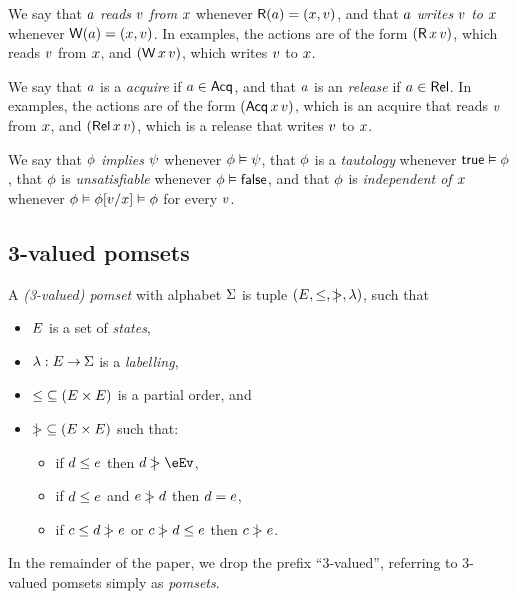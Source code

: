 We say that $a$ \emph{reads} $v$ \emph{from} $x$ whenever
$\mathsf{R}(a) = (x,v)$, and that $a$ \emph{writes} $v$
\emph{to} $x$ whenever $\mathsf{W}(a) = (x,v)$.  In examples,
the actions are of the form $(\DR{\aLoc}{\aVal})$, which reads $v$ from
$x$, and $(\DW{\aLoc}{\aVal})$, which writes $v$ to $x$.

We say that $a$ is a \emph{acquire} if $a\in\mathsf{Acq}$, and that $a$
is an \emph{release} if $a\in\mathsf{Rel}$.  In examples, the actions are of the
form $(\DRAcq{\aLoc}{\aVal})$, which is an acquire that reads $v$ from
$x$, and $(\DWRel{\aLoc}{\aVal})$, which is a release that writes $v$
to $x$.

We say that $\phi$ \emph{implies} $\psi$ whenever $\phi\vDash\psi$,
that $\phi$ is a \emph{tautology} whenever $\mathsf{true}\vDash\phi$, that
$\phi$ is \emph{unsatisfiable} whenever $\phi\vDash\mathsf{false}$, and that
$\phi$ is \emph{independent of $x$} whenever
$\phi \vDash \phi[v/x] \vDash \phi$ for every $v$.


\subsection{3-valued pomsets}
\label{sec:pomsets}

\begin{definition}
  A \emph{(3-valued) pomset} with alphabet $\Sigma$ is tuple $(E,
  {\le}, {\mathrel{\,\mid\!\!\!>}}, \lambda)$, such that 
  \begin{itemize}
  \item $E$ is a set of \emph{states},
  \item $\lambda: E \mathbin\rightarrow \Sigma$ is a \emph{labelling},
  \item ${\le} \subseteq (E\times E)$ is a partial order, and
  \item ${\mathrel{\,\mid\!\!\!>}} \subseteq (E\times E)$ such that:
    \begin{itemize}
    \item\label{5a} if $d \le e$ then $\bEv \gtN \eEv$,
    \item\label{5b} if $d \le e$ and $e \mathrel{\,\mid\!\!\!>} d$ then $d = e$,
    \item if $c \le d \mathrel{\,\mid\!\!\!>} e$ or $c \mathrel{\,\mid\!\!\!>} d \le e$ then $c \mathrel{\,\mid\!\!\!>} e$.
    \end{itemize}
\end{itemize}
\end{definition}
In the remainder of the paper, we drop the prefix ``3-valued'', referring to
3-valued pomsets simply as \emph{pomsets}.

